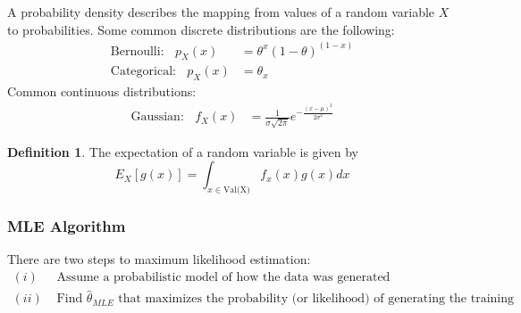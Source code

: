 \documentclass{article}
\theoremstyle{definition}
\newtheorem{definition}{Definition}[section]
\begin{document}
        A probability density describes the mapping from values of a random variable $X$ to probabilities. Some common 
        discrete distributions are the following:
        \begin{align}
            \text{Bernoulli:} \ \ \ \ p_X(x) &= \theta^x (1- \theta)^{(1-x)}\\
            \text{Categorical:} \ \ \ \ p_X(x) &= \theta_x
        \end{align}
        Common continuous distributions:
        \begin{align}
            \text{Gaussian:} \ \ \ \ f_X(x) &= \frac{1}{\sigma\sqrt{2\pi}}e^{-\frac{(x-\mu)^2}{2\sigma^2}}
        \end{align}
        \begin{mdframed}[]
            \begin{definition}
                The expectation of a random variable is given by 
                \[
                    E_X[g(x)] = \int_{x \in \text{Val(X)}}f_x(x)g(x)dx
                \]
            \end{definition}
        \end{mdframed}
    \subsubsection{MLE Algorithm}
        There are two steps to maximum likelihood estimation:
        \begin{align*}
            (i) & \text{ Assume a probabilistic model of how the data was generated} \\
            (ii) & \text{ Find $\hat\theta_{MLE}$ that maximizes the probability (or likelihood) of generating the training data under the probabilistic model.}
        \end{align*}
        
\end{document}
